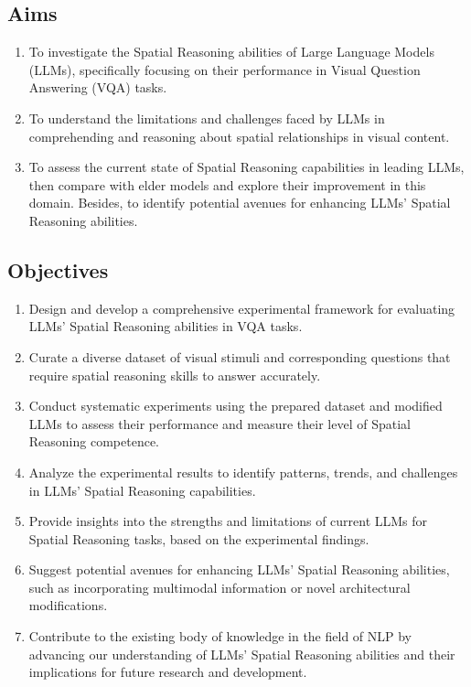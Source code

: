 \documentclass[journal,10pt]{IEEEtran}
\begin{document}
\subsection{Aims}
\begin{enumerate}
    \item To investigate the Spatial Reasoning abilities of Large Language Models (LLMs), specifically focusing on their performance in Visual Question Answering (VQA) tasks.
    \item To understand the limitations and challenges faced by LLMs in comprehending and reasoning about spatial relationships in visual content.
    \item To assess the current state of Spatial Reasoning capabilities in leading LLMs, then compare with elder models and explore their improvement in this domain. Besides, to identify potential avenues for enhancing LLMs' Spatial Reasoning abilities.
\end{enumerate}
\subsection{Objectives}
\begin{enumerate}
    \item Design and develop a comprehensive experimental framework for evaluating LLMs' Spatial Reasoning abilities in VQA tasks.
    \item Curate a diverse dataset of visual stimuli and corresponding questions that require spatial reasoning skills to answer accurately.
    \item Conduct systematic experiments using the prepared dataset and modified LLMs to assess their performance and measure their level of Spatial Reasoning competence.
    \item Analyze the experimental results to identify patterns, trends, and challenges in LLMs' Spatial Reasoning capabilities.
    \item Provide insights into the strengths and limitations of current LLMs for Spatial Reasoning tasks, based on the experimental findings.
    \item Suggest potential avenues for enhancing LLMs' Spatial Reasoning abilities, such as incorporating multimodal information or novel architectural modifications.
    \item Contribute to the existing body of knowledge in the field of NLP by advancing our understanding of LLMs' Spatial Reasoning abilities and their implications for future research and development.
\end{enumerate}
\end{document}
